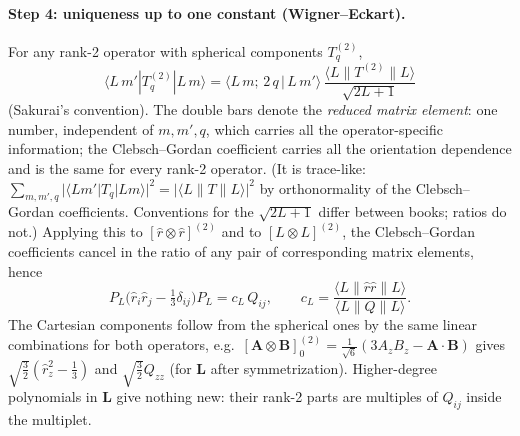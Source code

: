 \documentclass[11pt,a4paper]{article}
\numberwithin{equation}{section}
\theoremstyle{definition}
\theoremstyle{plain}
\theoremstyle{remark}
\numberwithin{algorithm}{section}
\newcommand{\vL}{\bm L}
\begin{document}
\paragraph{Step 4: uniqueness up to one constant (Wigner--Eckart).} For any rank-2 operator with spherical components $T^{(2)}_q$,
\begin{equation}
\langle L\,m'|T^{(2)}_q|L\,m\rangle=\langle L\,m;\,2\,q\,|\,L\,m'\rangle\,\frac{\langle L\|T^{(2)}\|L\rangle}{\sqrt{2L+1}}
\end{equation}
(Sakurai's convention). The double bars denote the \emph{reduced matrix element}: one number, independent of $m,m',q$, which carries all the operator-specific information; the Clebsch--Gordan coefficient carries all the orientation dependence and is the same for every rank-2 operator. (It is trace-like: $\sum_{m,m',q}|\langle Lm'|T_q|Lm\rangle|^2=|\langle L\|T\|L\rangle|^2$ by orthonormality of the Clebsch--Gordan coefficients. Conventions for the $\sqrt{2L+1}$ differ between books; ratios do not.) Applying this to $[\hat r\otimes\hat r]^{(2)}$ and to $[L\otimes L]^{(2)}$, the Clebsch--Gordan coefficients cancel in the ratio of any pair of corresponding matrix elements, hence
\begin{equation}
P_L\Big(\hat r_i\hat r_j-\tfrac13\delta_{ij}\Big)P_L=c_L\,Q_{ij},\qquad c_L=\frac{\langle L\|\hat r\hat r\|L\rangle}{\langle L\|Q\|L\rangle}.
\end{equation}
The Cartesian components follow from the spherical ones by the same linear combinations for both operators, e.g.\ $[\bm A\otimes\bm B]^{(2)}_0=\frac1{\sqrt6}(3A_zB_z-\bm A\cdot\bm B)$ gives $\sqrt{\frac32}(\hat r_z^2-\frac13)$ and $\sqrt{\frac32}Q_{zz}$ (for $\vL$ after symmetrization). Higher-degree polynomials in $\vL$ give nothing new: their rank-2 parts are multiples of $Q_{ij}$ inside the multiplet.
\end{document}
